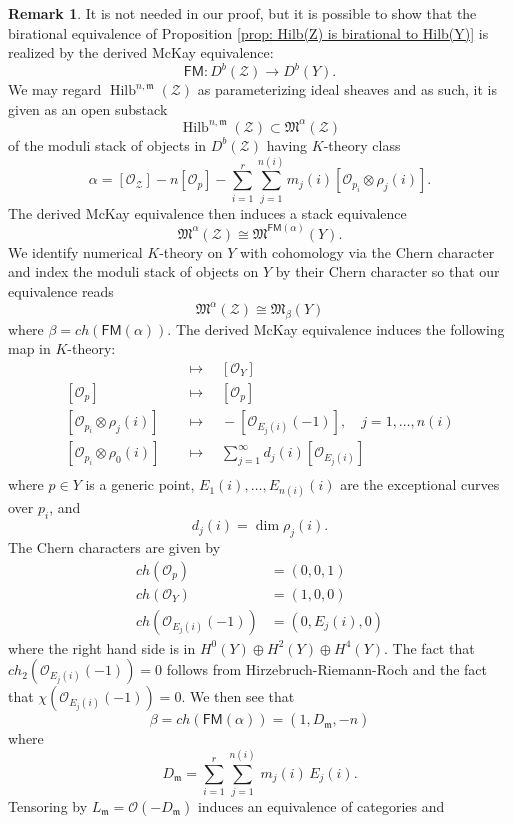 \documentclass{amsart}
\theoremstyle{definition}
\newtheorem{remark}[theorem]{Remark}
\newcommand{\M}{\mathfrak{M}}
\newcommand{\mdata}{\mathfrak{m}}
\newcommand{\FM}{\mathsf{FM}}
\renewcommand{\O}{\mathcal{O}}
\newcommand{\Zcal}{\mathcal{Z}}
\newcommand{\Hilb}{\operatorname{Hilb}}
\begin{document}
\begin{remark}
	It is not needed in our proof, but it is possible to show that the birational equivalence of Proposition \ref{prop: Hilb(Z) is birational to Hilb(Y)} is realized by the derived McKay equivalence:
	\[
	\FM :D^{b}(\Zcal) \to D^{b}(Y).
	\]
	We
	may regard $\Hilb^{n,\mdata}(\Zcal )$ as parameterizing ideal
	sheaves and as such, it is given as an open substack
	\[
	\Hilb^{n,\mdata}(\Zcal )\subset \M^{\alpha}(\Zcal ) 
	\]
	of the moduli stack of objects in $D^{b}(\Zcal )$ having $K$-theory
	class
	\[
	\alpha = [\O_{\Zcal}] - n[\O_{p}] - \sum_{i=1}^{r} \sum_{j=1}^{n(i)}
	m_{j}(i)[\O_{p_{i}}\otimes \rho_{j}(i)] .
	\]
	The derived McKay equivalence then induces a stack equivalence
	\[
	\M^{\alpha} (\Zcal )\cong \M^{\FM (\alpha )}(Y).
	\]
	We identify numerical $K$-theory on $Y$ with cohomology via the Chern
	character and index the moduli stack of objects on $Y$ by their Chern
	character so that our equivalence reads
	\[
	\M^{\alpha}(\Zcal )\cong  \M_{\beta}(Y)
	\]
	where $\beta =ch(\FM (\alpha ))$. The derived McKay equivalence induces the
	following map in $K$-theory:
	\begin{align*}
	[\O_{\Zcal }] & \quad \longmapsto \quad  [\O_{Y}]\\
	[\O_{p }] & \quad \longmapsto \quad  [\O_{p}]\\
	[\O_{p_{i}}\otimes \rho_{j}(i)] & \quad \longmapsto \quad  -[\O_{E_{j}(i)}(-1)],\quad j=1,\dotsc, n(i) \\
	[\O_{p_{i}}\otimes \rho_{0}(i)] & \quad \longmapsto \quad  \sum_{j=1}^{\infty }d_{j}(i)[\O_{E_{j}(i)}]\\
	\end{align*}
	where $p\in Y$ is a generic point, $E_{1}(i),\dotsc ,E_{n(i)}(i)$ are
	the exceptional curves over $p_{i}$, and 
	\[
	d_{j}(i) = \dim \rho_{j}(i).
	\]
	The Chern characters are given by
	\begin{align*}
	ch(\O_{p}) & = (0,0,1) \\
	ch(\O_{Y}) & = (1,0,0) \\
	ch(\O_{E_{j}(i)}(-1)) & = (0,E_{j}(i),0)
	\end{align*}
	where the right hand side is in $H^{0}(Y)\oplus H^{2}(Y)\oplus
	H^{4}(Y)$. The fact that $ch_{2}(\O_{E_{j}(i)}(-1)) = 0$ follows from
	Hirzebruch-Riemann-Roch and the fact that $\chi
	(\O_{E_{j}(i)}(-1))=0$.
	We then see that 
	\[
	\beta  = ch(\FM (\alpha )) = (1, D_{\mdata},-n)
	\]
	where
	\[
	D_{\mdata} = \sum_{i=1}^{r} \sum_{j=1}^{n(i)} \, m_{j}(i)\, E_{j}(i).
	\]
	Tensoring by $L_{\mdata} = \O (-D_{\mdata})$ induces an equivalence of categories and

\end{remark}
\end{document}
